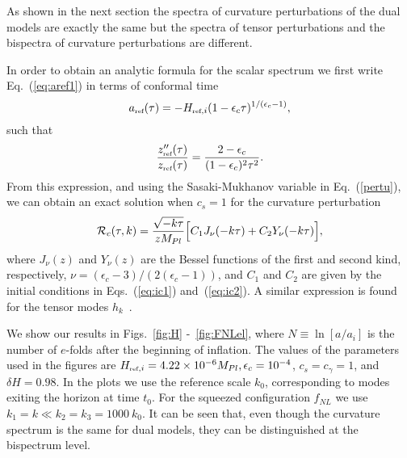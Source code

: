 \documentclass[aps,prl,amsmath,nofootinbib,twocolumn]{revtex4}
\newcommand{\3}{\partial}
\newcommand{\4}{\frac}
\newcommand{\5}{\delta}
\renewcommand\({\left(}
\renewcommand\){\right)}
\renewcommand\[{\left[}
\renewcommand\]{\right]}
\def\R{{\mathcal R}}
\newcommand{\be}{\begin{equation}}
\newcommand{\ee}{\end{equation}}
\newcommand{\reff}{{\mbox{\tiny ref}}}
\newcommand{\eqn}[1]{(\ref{#1})}
\begin{document}
As shown in the next section the spectra of curvature perturbations of the dual models  are exactly the same but the spectra of tensor perturbations and the bispectra of curvature perturbations are different.

In order to obtain an analytic formula for the scalar spectrum we first write Eq.~\eqn{eq:aref1} in terms of conformal time
\be
a_\reff (\tau) = - H_{\reff,i} (1-\epsilon_c  \tau )^{1/(\epsilon_c-1)} ,
\ee
such that
\be \label{azppz}
\frac{z_\reff''(\tau)}{z_\reff(\tau)} = \frac{2-\epsilon_c}{ (1-\epsilon_c)^2  \tau ^2} .
\ee
From this expression, and using the Sasaki-Mukhanov variable in Eq.~\eqn{pertu}, we can obtain an exact solution when $c_s=1$ for the curvature perturbation~\cite{ Wang:2013eqj, 2009arXiv0902.1529K}
\be\label{aR}
\R_c(\tau,k)=\frac{\sqrt{-k \tau }}{z M_{Pl}} \Bigl[C_1 J_\nu{(-k \tau )} + C_2 Y_\nu{(-k \tau )} \Bigr],
\ee
where $J_\nu(z)$ and $Y_\nu(z)$ are the Bessel functions of the first and second kind, respectively, $\nu= (\epsilon_c-3)/(2 (\epsilon_c-1))$, and $C_1$ and $C_2$ are given by the initial conditions in  Eqs.~\eqn{eq:ic1} and~\eqn{eq:ic2}. A similar expression is found for the tensor modes $h_k$~\cite{Wang:2013eqj, 2009arXiv0902.1529K}.

We show our results in Figs.~\ref{fig:H} -~\ref{fig:FNLel}, where $N \equiv \ln[a/a_i]$ is the number of $e$-folds  after the beginning of inflation. The values of the parameters used in the figures are $H_{\reff,i}=4.22\times 10^{-6} M_{Pl}, \epsilon_c=10^{-4}$, $c_s=c_{\gamma}=1$, and $\delta H=0.98$.
In the plots we use the reference scale $k_0$, corresponding to modes exiting the horizon at time $t_0$.  %
For the squeezed configuration $f_{NL}$ we use $k_1=k \ll k_2=k_3=1000~k_0$. It can be  seen that, even though the curvature spectrum is the same for dual models, they can be distinguished   at the bispectrum level. 
\end{document}
